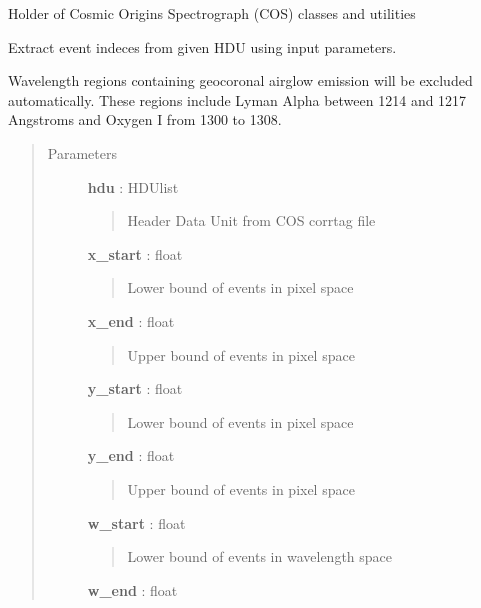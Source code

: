 \documentclass[letterpaper,10pt,english]{sphinxmanual}
\begin{document}
\label{index:module-lightcurve.cos}
Holder of Cosmic Origins Spectrograph (COS) classes and utilities

\begin{fulllineitems}
\label{index:lightcurve.cos.extract_index}
Extract event indeces from given HDU using input parameters.

Wavelength regions containing geocoronal airglow emission will be excluded
automatically.  These regions include Lyman Alpha between 1214 and 1217
Angstroms and Oxygen I from 1300 to 1308.
\begin{quote}\begin{description}
\item[{Parameters }] \leavevmode
\textbf{hdu} : HDUlist
\begin{quote}

Header Data Unit from COS corrtag file
\end{quote}

\textbf{x\_start} : float
\begin{quote}

Lower bound of events in pixel space
\end{quote}

\textbf{x\_end} : float
\begin{quote}

Upper bound of events in pixel space
\end{quote}

\textbf{y\_start} : float
\begin{quote}

Lower bound of events in pixel space
\end{quote}

\textbf{y\_end} : float
\begin{quote}

Upper bound of events in pixel space
\end{quote}

\textbf{w\_start} : float
\begin{quote}

Lower bound of events in wavelength space
\end{quote}

\textbf{w\_end} : float
\begin{quote}


\end{quote}
\end{description}
\end{quote}
\end{fulllineitems}
\end{document}
